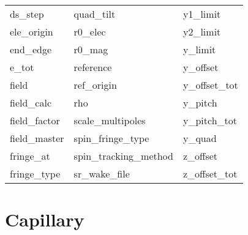 \begin{tabular}{lll}
ds_step                     & quad_tilt                   & y1_limit                    \\
ele_origin                  & r0_elec                     & y2_limit                    \\
end_edge                    & r0_mag                      & y_limit                     \\
e_tot                       & reference                   & y_offset                    \\
field                       & ref_origin                  & y_offset_tot                \\
field_calc                  & rho                         & y_pitch                     \\
field_factor                & scale_multipoles            & y_pitch_tot                 \\
field_master                & spin_fringe_type            & y_quad                      \\
fringe_at                   & spin_tracking_method        & z_offset                    \\
fringe_type                 & sr_wake_file                & z_offset_tot                \\
 \bottomrule
 \end{tabular}
 \vfill
 
 \section{Capillary}
 \label{s:list.capillary}
 
